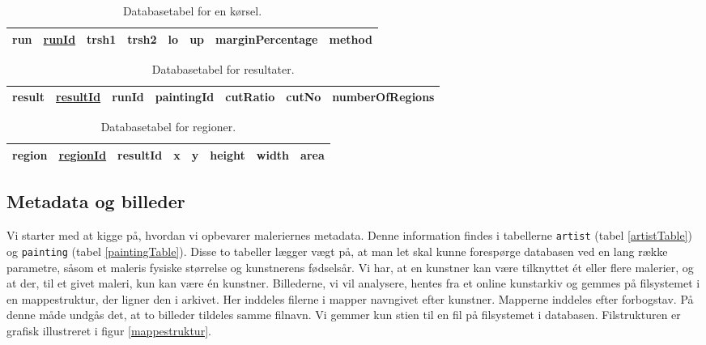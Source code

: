 {\begin{table}[!h]
    \centering
    \begin{tabular}{|l||c|c|c|c|c|c|c|}
        \hline
        \bf{run} \hspace{0.5cm} & \underline{runId} & trsh1 & trsh2 & lo & up & marginPercentage & method \\\hline
    \end{tabular}
    \caption{Databasetabel for en kørsel.}
    \label{runTable}
\end{table}

\begin{table}[!h]
    \centering
    \begin{tabular}{|l||c|c|c|c|c|c|}
        \hline
        \bf{result} \hspace{0.5cm} & \underline{resultId} & runId & paintingId & cutRatio & cutNo & numberOfRegions \\\hline
    \end{tabular}
    \caption{Databasetabel for resultater.}
    \label{resultTable}
\end{table}

\begin{table}[!h]
    \centering
    \begin{tabular}{|l||c|c|c|c|c|c|c|}
        \hline
        \bf{region} \hspace{0.5cm} & \underline{regionId} & resultId & x & y & height & width & area \\\hline
    \end{tabular}
    \caption{Databasetabel for regioner.}
    \label{regionTable}
\end{table}

\subsection{Metadata og billeder\label{section_opbv_billeder}}
Vi starter med at kigge på, hvordan vi opbevarer maleriernes metadata.
Denne information findes i tabellerne \texttt{artist} (tabel
\ref{artistTable}) og \texttt{painting} (tabel \ref{paintingTable}).
Disse to tabeller lægger vægt på, at man let skal kunne forespørge
databasen ved en lang række parametre, såsom et maleris fysiske
størrelse og kunstnerens fødselsår. Vi har, at en kunstner kan være
tilknyttet ét eller flere malerier, og at der, til et givet maleri, kun
kan være én kunstner. Billederne, vi vil analysere, hentes fra et online
kunstarkiv og gemmes på filsystemet i en mappestruktur, der ligner den i
arkivet. Her inddeles filerne i mapper navngivet efter kunstner.
Mapperne inddeles efter forbogstav. På denne måde undgås det, at to
billeder tildeles samme filnavn. Vi gemmer kun stien til en fil på
filsystemet i databasen. Filstrukturen er grafisk illustreret i figur
\ref{mappestruktur}.

}
